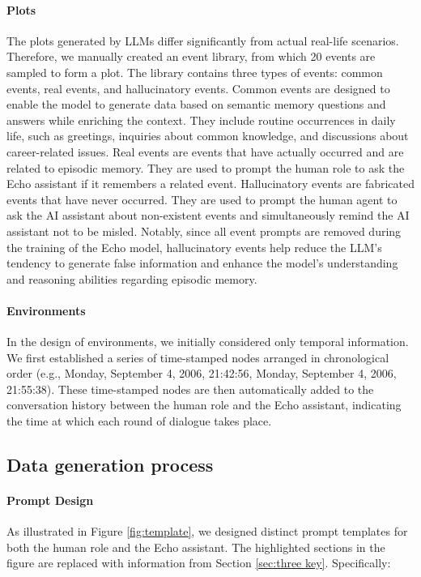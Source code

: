 \paragraph{Plots}
The plots generated by LLMs differ significantly from actual real-life scenarios. Therefore, we manually created an event library, from which 20 events are sampled to form a plot. The library contains three types of events: common events, real events, and hallucinatory events. Common events are designed to enable the model to generate data based on semantic memory questions and answers while enriching the context. They include routine occurrences in daily life, such as greetings, inquiries about common knowledge, and discussions about career-related issues. Real events are events that have actually occurred and are related to episodic memory. They are used to prompt the human role to ask the Echo assistant if it remembers a related event. Hallucinatory events are fabricated events that have never occurred. They are used to prompt the human agent to ask the AI assistant about non-existent events and simultaneously remind the AI assistant not to be misled. Notably, since all event prompts are removed during the training of the Echo model, hallucinatory events help reduce the LLM's tendency to generate false information and enhance the model's understanding and reasoning abilities regarding episodic memory.


\paragraph{Environments}
In the design of environments, we initially considered only temporal information. We first established a series of time-stamped nodes arranged in chronological order (e.g., Monday, September 4, 2006, 21:42:56, Monday, September 4, 2006, 21:55:38). These time-stamped nodes are then automatically added to the conversation history between the human role and the Echo assistant, indicating the time at which each round of dialogue takes place.

\subsection{Data generation process}
\label{sec:dgp}


\paragraph{Prompt Design}

As illustrated in Figure \ref{fig:template}, we designed distinct prompt templates for both the human role and the Echo assistant. The highlighted sections in the figure are replaced with information from Section \ref{sec:three key}. Specifically:

